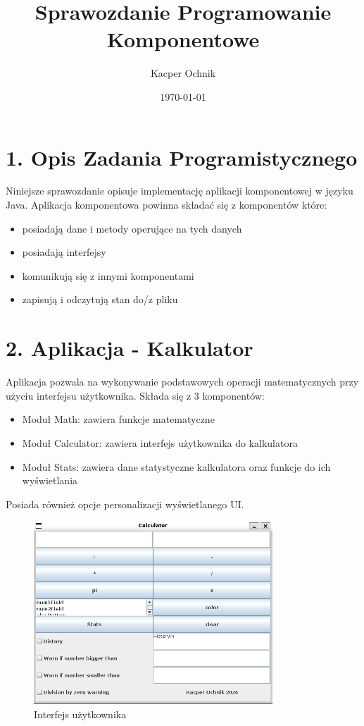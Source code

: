 \documentclass{article}
\title{Sprawozdanie Programowanie Komponentowe}
\author{Kacper Ochnik}
\date{\today}
\begin{document}
\maketitle

\newpage
\section*{1. Opis Zadania Programistycznego}

Niniejsze sprawozdanie opisuje implementację aplikacji komponentowej w języku Java.
Aplikacja komponentowa powinna składać się z komponentów które:
\begin{itemize}
    \item posiadają dane i metody operujące na tych danych
    \item posiadają interfejsy
    \item komunikują się z innymi komponentami
    \item zapisują i odczytują stan do/z pliku
\end{itemize}
\section*{2. Aplikacja - Kalkulator}

Aplikacja pozwala na wykonywanie podstawowych operacji matematycznych
przy użyciu interfejsu użytkownika.
Składa się z 3 komponentów:
\begin{itemize}
    \item Moduł Math: zawiera funkcje matematyczne
    \item Moduł Calculator: zawiera interfejs użytkownika do kalkulatora
    \item Moduł Stats: zawiera dane statystyczne kalkulatora oraz funkcje do ich wyświetlania
\end{itemize}
Posiada również opcje personalizacji wyświetlanego UI.

\begin{figure}[ht]
    \centering
    \includegraphics[width=0.8\textwidth]{./img/ui.png}
    \caption{Interfejs użytkownika}
    \label{fig:ui}
\end{figure}
\end{document}
